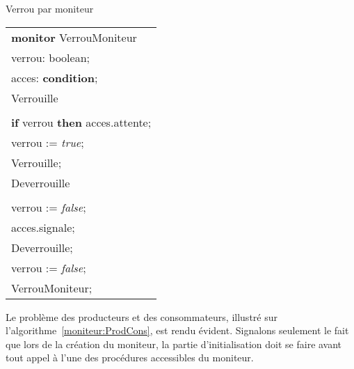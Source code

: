 \begin{algorithm}[!htb]
\caption{Verrou par moniteur}\label{moniteur:exempleVerrou}
\begin{center}
\begin{tabular}{l}
{\bf monitor} VerrouMoniteur \\
\hspace{0.3cm}{\bf var} verrou: boolean; \\
\hspace{0.3cm}{\bf var} acces: {\bf condition}; \\

\hspace{0.3cm}{\bf entry procedure} Verrouille \\
\hspace{0.6cm}{\bf begin} \\
\hspace{1cm} {\bf if} verrou {\bf then} acces.attente; \\
\hspace{1cm} verrou := {\em true}; \\
\hspace{0.6cm}{\bf end} Verrouille; \\

\hspace{0.3cm}{\bf entry procedure} Deverrouille \\
\hspace{0.6cm}{\bf begin} \\
\hspace{1cm}verrou := {\em false}; \\
\hspace{1cm}acces.signale; \\
\hspace{0.6cm}{\bf end} Deverrouille; \\

\hspace{0.3cm}{\bf begin} verrou := {\em false}; \\
\hspace{0.3cm}{\bf end} VerrouMoniteur;
\end{tabular}
\end{center}
\end{algorithm}
\par
Le problème des producteurs et des consommateurs, illustré sur l'algorithme~\ref{moniteur:ProdCons}, est rendu évident. Signalons seulement le fait que lors de la création du moniteur, la partie d'initialisation doit se faire avant tout appel à l'une des procédures accessibles du moniteur.
